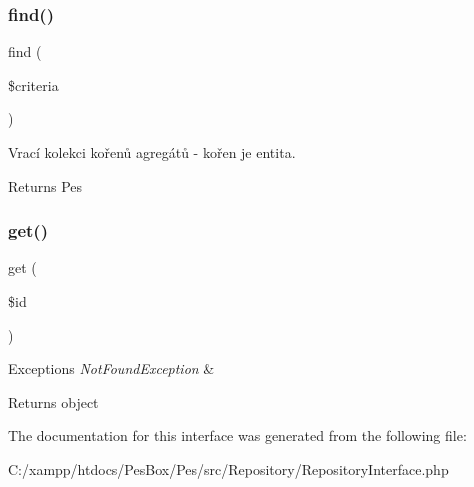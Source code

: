 \subsubsection{\texorpdfstring{find()}{find()}}
{\footnotesize\ttfamily find (\begin{DoxyParamCaption}\item[{Criteria\+Interface}]{\$criteria }\end{DoxyParamCaption})}

Vrací kolekci kořenů agregátů -\/ kořen je entita.

\begin{DoxyReturn}{Returns}
Pes 
\end{DoxyReturn}
\mbox{\label{interface_pes_1_1_repository_1_1_repository_interface_a50e3bfb586b2f42932a6a93f3fbb0828}} 
\subsubsection{\texorpdfstring{get()}{get()}}
{\footnotesize\ttfamily get (\begin{DoxyParamCaption}\item[{}]{\$id }\end{DoxyParamCaption})}


\begin{DoxyExceptions}{Exceptions}
{\em Not\+Found\+Exception} & \\
\hline
\end{DoxyExceptions}
\begin{DoxyReturn}{Returns}
object 
\end{DoxyReturn}


The documentation for this interface was generated from the following file\+:\begin{DoxyCompactItemize}
\item 
C\+:/xampp/htdocs/\+Pes\+Box/\+Pes/src/\+Repository/Repository\+Interface.\+php\end{DoxyCompactItemize}
